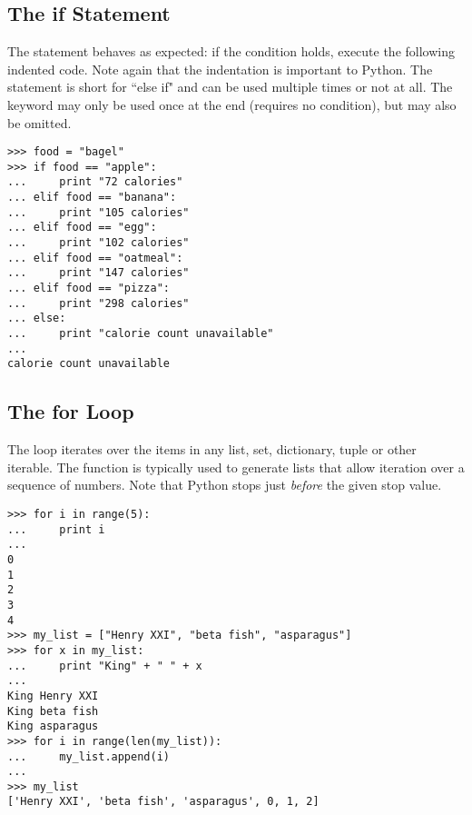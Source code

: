 \subsection*{The if Statement}
\begin{example}

The  statement behaves as expected: if the condition holds, execute the 
following indented code. Note again that the indentation is important to Python. 
The  statement is short for ``else if" and can be used multiple times or not at all. 
The  keyword may only be used once at the end (requires no condition), 
but may also be omitted. 

\begin{lstlisting}
>>> food = "bagel"
>>> if food == "apple":
...     print "72 calories"
... elif food == "banana":
...     print "105 calories"
... elif food == "egg":
...     print "102 calories"
... elif food == "oatmeal":
...     print "147 calories"
... elif food == "pizza":
...     print "298 calories"
... else: 
...     print "calorie count unavailable"
...     
calorie count unavailable
\end{lstlisting}
\end{example}

\subsection*{The for Loop}
\begin{example}

The  loop iterates over the items in any list, set, dictionary, tuple or other iterable. 
The  function is typically used to generate lists that allow iteration 
over a sequence of numbers. Note that Python stops just \emph{before} the given stop value. 

\begin{lstlisting}
>>> for i in range(5):
...     print i
...     
0
1
2
3
4
>>> my_list = ["Henry XXI", "beta fish", "asparagus"]
>>> for x in my_list:
...     print "King" + " " + x
...     
King Henry XXI
King beta fish
King asparagus
>>> for i in range(len(my_list)):
...     my_list.append(i)
...     
>>> my_list
['Henry XXI', 'beta fish', 'asparagus', 0, 1, 2]
\end{lstlisting}
\end{example}


